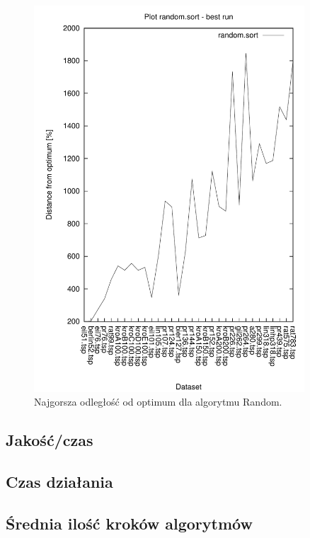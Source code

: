\begin{figure}
\begin{center}
\includegraphics[width=0.9\textwidth]{wykresy/random_sort_worst}
\end{center}
\caption{Najgorsza odległość od optimum dla algorytmu Random.}
\label{random_sort_worst}
\end{figure}

\subsection{Jakość/czas}


\subsection{Czas działania}



\subsection{Średnia ilość kroków algorytmów}


